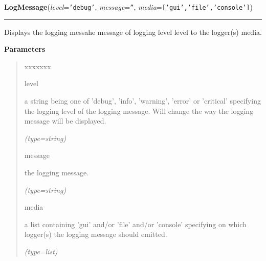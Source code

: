 \hspace{.8\funcindent}\begin{boxedminipage}{\funcwidth}

    \raggedright \textbf{LogMessage}(\textit{level}={\tt 'debug'}, \textit{message}={\tt ''}, \textit{media}={\tt ['gui','file','console']})

    \vspace{-1.5ex}

    \rule{\textwidth}{0.5\fboxrule}
\setlength{\parskip}{2ex}
    Displays the logging messahe {\textbar}message{\textbar} of logging 
    level {\textbar}level{\textbar} to the logger(s) 
    {\textbar}media{\textbar}.

\setlength{\parskip}{1ex}
      \textbf{Parameters}
      \vspace{-1ex}

      \begin{quote}
        \begin{Ventry}{xxxxxxx}

          \item[level]

          a string being one of 'debug', 'info', 'warning', 'error' or 
          'critical' specifying the logging level of the logging message. 
          Will change the way the logging message will be displayed.

            {\it (type=string)}

          \item[message]

          the logging message.

            {\it (type=string)}

          \item[media]

          a list containing 'gui' and/or 'file' and/or 'console' specifying
          on which logger(s) the logging message should emitted.

            {\it (type=list)}

        \end{Ventry}

      \end{quote}

    \end{boxedminipage}



